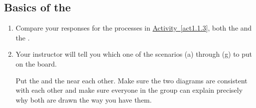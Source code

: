 \WCD

\subsection{Basics of the \EnergyInteractionModel{}}


\begin{fnt}
	
\end{fnt}

\begin{enumerate}
	\item Compare your responses for the processes in \hyperref[act1.1.3]{Activity~\ref*{act1.1.3}}, both the \TempGraphs{} and the \EnergyDiagrams{}.
	
	\item Your instructor will tell you which one of the scenarios (a) through (g) to put on the board.
		
	Put the \TempGraph{} and the \EnergyDiagram{} near each other. Make sure the two diagrams are consistent with each other and make sure everyone in the group can explain precisely why both are drawn the way you have them.

\WCD

\end{enumerate}
